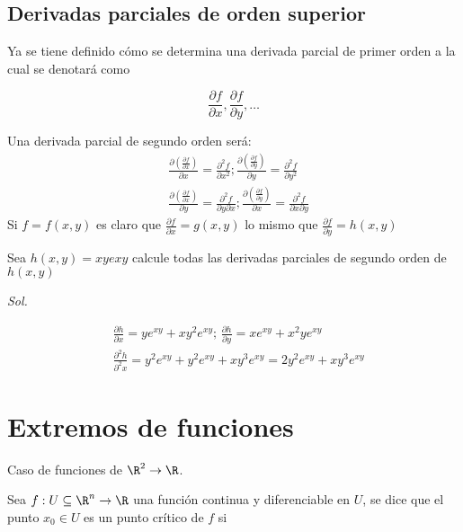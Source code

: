\subsection{Derivadas parciales de orden superior}

Ya se tiene definido cómo se determina una derivada
parcial de primer orden a la cual se denotará como

\begin{notation}
	\begin{equation*}
		\frac{\partial f}{\partial x}, \frac{\partial f}{\partial y},\dots
	\end{equation*}
\end{notation}

Una derivada parcial de segundo orden será:
\begin{align*}
	 & \frac{\partial\left(\frac{\partial f}{\partial x}\right)}{\partial x}=\frac{\partial^2f}{\partial x^2}; \frac{\partial\left(\frac{\partial f}{\partial y}\right)}{\partial y}=\frac{\partial^2f}{\partial y^2}                 \\
	 & \frac{\partial\left(\frac{\partial f}{\partial x}\right)}{\partial y}=\frac{\partial^2f}{\partial y\partial x}; \frac{\partial\left(\frac{\partial f}{\partial y}\right)}{\partial x}=\frac{\partial^2f}{\partial x\partial y}
\end{align*}
Si $f=f(x,y)$ es claro que $\frac{\partial f}{\partial x}=g(x,y)$
lo mismo que $\frac{\partial f}{\partial y}=h(x,y)$

\begin{example}
	Sea $h(x,y)=xye{xy}$ calcule todas las derivadas parciales de segundo orden de $h(x,y)$
\end{example}

\textit{ Sol. }

\begin{align*}
	 & \frac{\partial h}{\partial x}=ye^{xy}+xy^2e^{xy};\, \frac{\partial h}{\partial y}=xe^{xy}+x^2ye^{xy} \\
	 & \frac{\partial^2 h}{\partial^2 x}=y^2e^{xy}+y^2e^{xy}+xy^3e^{xy}=2y^2e^{xy}+xy^3e^{xy}
\end{align*}

\section{Extremos de funciones}

Caso de funciones de $\R^2\to \R$.

Sea $f:U\subseteq \R^n\to \R$ una función continua y diferenciable en $U$,
se dice que el punto $x_0\in U$ es un punto crítico de $f$ si


